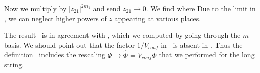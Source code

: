 Now we multiply by $|z_{21}|^{2 m_1}$ and
send $z_{21} \to 0$. We find
\eqn{}
where
\eqn{}
Due to the limit in \final , we can neglect higher powers of $z$
appearing at various places.

The result \final\ is in agreement with
\threepx , which we computed by going through the $m$ basis.
We should point out that the factor $1/V_{conf}$ in
\threepx\ is absent in \final. Thus
the definition \ includes the rescaling
$\Phi \rightarrow \widehat{\Phi} = V_{conf} \Phi$
that we performed for the long string.


